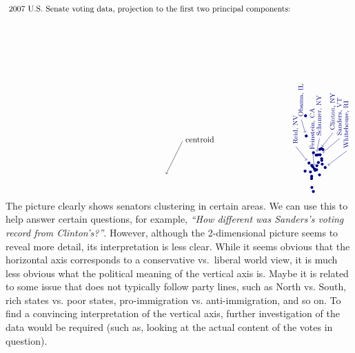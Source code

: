 \begin{equation*}
\begin{tikzpicture}[scale=0.71]
    \dataD{Cantwell}{Maria}{D}{WA}{8.453248}{0.176907}{0}
    \dataD{Feingold}{Russ}{D}{WI}{8.479149}{3.536569}{-0.15}
    \dataDx{Obama}{Barack}{D}{IL}{8.521068}{2.312086}{-0.3}
    \dataDx{Reid}{Harry}{D}{NV}{8.689703}{0.665197}{-0.8}
    \dataD{Mikulski}{Barbara}{D}{MD}{8.776657}{0.129926}{0}
    \dataD{Wyden}{Ron}{D}{OR}{8.846398}{-0.272109}{0}
    \dataD{Leahy}{Patrick}{D}{VT}{8.853166}{-0.139810}{0}
    \dataD{Harkin}{Tom}{D}{IA}{8.859139}{0.517913}{0}
    \dataD{Klobuchar}{Amy}{D}{MN}{8.865049}{-0.814168}{0}
    \dataD{Murray}{Patty}{D}{WA}{8.923771}{0.434588}{0}
    \dataD{Akaka}{Daniel}{D}{HI}{8.955400}{-1.058981}{0}
    \dataD{Brown}{Sherrod}{D}{OH}{8.961322}{1.297369}{0}
    \dataDx{Feinstein}{Dianne}{D}{CA}{9.019263}{0.316944}{-0.1}
    \dataD{Bingaman}{Jeff}{D}{NM}{9.063834}{0.227690}{0}
    \dataDx{Schumer}{Charles}{D}{NY}{9.124474}{1.151808}{0.2}
    \dataD{Cardin}{Benjamin}{D}{MD}{9.154539}{0.261731}{0}
    \dataD{Kohl}{Herb}{D}{WI}{9.168217}{0.505190}{0}
    \dataD{Casey}{Bob}{D}{PA}{9.227674}{1.165228}{0}
    \dataD{Stabenow}{Debbie}{D}{MI}{9.259294}{0.701454}{0}
    \dataD{Reed}{John}{D}{RI}{9.328214}{-0.051071}{0}
    \dataDx{Clinton}{Hillary}{D}{NY}{9.345548}{1.498053}{0.8}
    \dataDx{Sanders}{Bernard}{I}{VT}{9.366115}{1.166931}{1.2}
    \dataD{Durbin}{Richard}{D}{IL}{9.450949}{1.549572}{0}
    \dataD{Lautenberg}{Frank}{D}{NJ}{9.458477}{0.934696}{0}
    \dataD{Levin}{Carl}{D}{MI}{9.464507}{0.830443}{0}
    \dataD{Menendez}{Robert}{D}{NJ}{9.493317}{0.599649}{0}
    \dataD{Boxer}{Barbara}{D}{CA}{9.537760}{1.490709}{0}
    \dataDx{Whitehouse}{Sheldon}{D}{RI}{9.675169}{0.398093}{1.3}
    \draw[->] (0,0) +(1,2) node[right,yshift=2] {centroid} -- +(0,0);
    \path (-1,10) node {2007 U.S. Senate voting data, projection to the first two principal components:};
  \end{tikzpicture}
\end{equation*}
The picture clearly shows senators clustering in certain areas. We can
use this to help answer certain questions, for example, {\em ``How
  different was Sanders's voting record from Clinton's?''}. However,
although the 2-dimensional picture seems to reveal more detail, its
interpretation is less clear. While it seems obvious that the
horizontal axis corresponds to a conservative vs.\ liberal world view,
it is much less obvious what the political meaning of the vertical
axis is. Maybe it is related to some issue that does not typically
follow party lines, such as North vs. South, rich states vs. poor
states, pro-immigration vs. anti-immigration, and so on.  To find a
convincing interpretation of the vertical axis, further investigation
of the data would be required (such as, looking at the actual content
of the votes in question).

